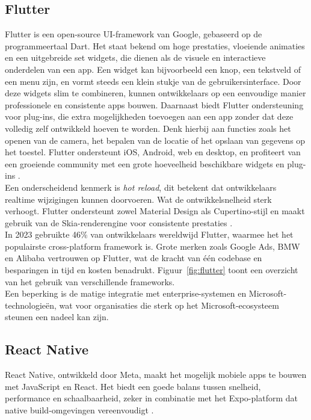 \subsection{Flutter}
Flutter is een open-source UI-framework van Google, gebaseerd op de programmeertaal Dart. Het staat bekend om hoge prestaties, vloeiende animaties en een uitgebreide set widgets, die dienen als de visuele en interactieve onderdelen van een app. Een widget kan bijvoorbeeld een knop, een tekstveld of een menu zijn, en vormt steeds een klein stukje van de gebruikersinterface. Door deze widgets slim te combineren, kunnen ontwikkelaars op een eenvoudige manier professionele en consistente apps bouwen. Daarnaast biedt Flutter ondersteuning voor plug-ins, die extra mogelijkheden toevoegen aan een app zonder dat deze volledig zelf ontwikkeld hoeven te worden. Denk hierbij aan functies zoals het openen van de camera, het bepalen van de locatie of het opslaan van gegevens op het toestel. Flutter ondersteunt iOS, Android, web en desktop, en profiteert van een groeiende community met een grote hoeveelheid beschikbare widgets en plug-ins \autocite{Gajjam2025}.\\

Een onderscheidend kenmerk is \emph{hot reload}, dit betekent dat ontwikkelaars realtime wijzigingen kunnen doorvoeren. Wat de ontwikkelsnelheid sterk verhoogt. Flutter ondersteunt zowel Material Design als Cupertino-stijl en maakt gebruik van de Skia-renderengine voor consistente prestaties \autocite{Rodriguez2025}.\\

In 2023 gebruikte 46\% van ontwikkelaars wereldwijd Flutter, waarmee het het populairste cross-platform framework is. Grote merken zoals Google Ads, BMW en Alibaba vertrouwen op Flutter, wat de kracht van één codebase en besparingen in tijd en kosten benadrukt. Figuur~\ref{fig:flutter} toont een overzicht van het gebruik van verschillende frameworks.\\

Een beperking is de matige integratie met enterprise-systemen en Microsoft-\\technologieën, wat voor organisaties die sterk op het Microsoft-ecosysteem\\ steunen een nadeel kan zijn.

\subsection{React Native}
React Native, ontwikkeld door Meta, maakt het mogelijk mobiele apps te bouwen met JavaScript en React. Het biedt een goede balans tussen snelheid, performance en schaalbaarheid, zeker in combinatie met het Expo-platform dat native build-omgevingen vereenvoudigt \autocite{Ivanov2025}.\\


